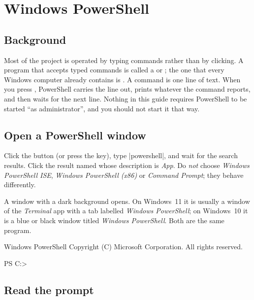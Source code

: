 \section{Windows PowerShell}
\label{sec:powershell}

\subsection{Background}

Most of the project is operated by typing commands rather than by clicking. A program that
accepts typed commands is called a  or ; the one that every
Windows computer already contains is . A command is one line of text.
When you press , PowerShell carries the line out, prints whatever the command
reports, and then waits for the next line. Nothing in this guide requires PowerShell to be
started ``as administrator'', and you should not start it that way.

\subsection{Open a PowerShell window}

\label{st:openps}
Click the  button (or press the  key), type \code|powershell|, and wait
for the search results. Click the result named  whose description is
\emph{App}. Do \emph{not} choose \emph{Windows PowerShell ISE}, \emph{Windows PowerShell (x86)}
or \emph{Command Prompt}; they behave differently.

A window with a dark background opens. On Windows~11 it is usually a window of the
\emph{Terminal} app with a tab labelled \emph{Windows PowerShell}; on Windows~10 it is a blue or
black window titled \emph{Windows PowerShell}. Both are the same program.

\begin{out}
Windows PowerShell
Copyright (C) Microsoft Corporation. All rights reserved.

PS C:\Users\ttrojan>
\end{out}


\subsection{Read the prompt}

